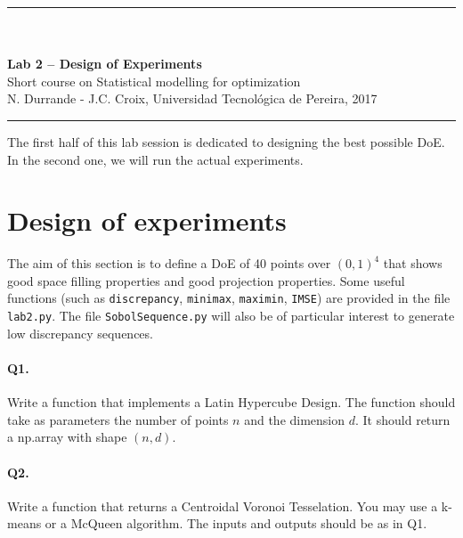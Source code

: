 \documentclass[12pt]{scrartcl}
\begin{document}
\begin{center}
	\rule{\textwidth}{1pt}
	\\ \ \\
	{\LARGE \textbf{Lab 2 -- Design of Experiments}}\\
	\vspace{3mm}
	{\large Short course on Statistical modelling for optimization\\ \vspace{3mm}}
	{\normalsize N. Durrande - J.C. Croix, Universidad Tecnol\'ogica de Pereira, 2017}\\
	\vspace{3mm}
	\rule{\textwidth}{1pt}
	\vspace{5mm}
\end{center}
The first half of this lab session is dedicated to designing the best possible DoE. In the second one, we will run the actual experiments.

\section{Design of experiments}
The aim of this section is to define a DoE of 40 points over $(0,1)^4$ that shows good space filling properties and good projection properties. Some useful functions (such as \texttt{discrepancy}, \texttt{minimax}, \texttt{maximin}, \texttt{IMSE}) are provided in the file \texttt{lab2.py}. The file \texttt{SobolSequence.py} will also be of particular interest to generate low discrepancy sequences.

\paragraph{Q1.} Write a function that implements a Latin Hypercube Design. The function should take as parameters the number of points $n$ and the dimension $d$. It should return a np.array with shape $(n,d)$.

\paragraph{Q2.} Write a function that returns a Centroidal Voronoi Tesselation. You may use a k-means or a McQueen algorithm. The inputs and outputs should be as in Q1.
\end{document}
